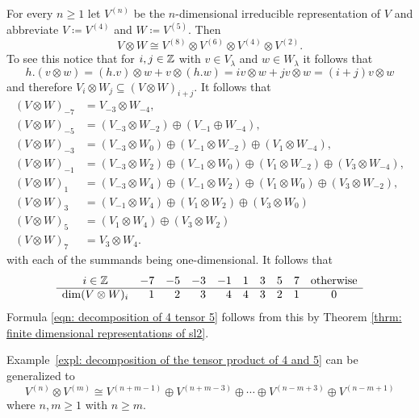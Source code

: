 \begin{expl}\label{expl: decomposition of the tensor product of 4 and 5}
 For every $n \geq 1$ let $V^{(n)}$ be the $n$-dimensional irreducible representation of $V$ and abbreviate $V \coloneqq V^{(4)}$ and $W \coloneqq V^{(5)}$. Then
 \begin{equation}\label{eqn: decomposition of 4 tensor 5}
  V \otimes W \cong V^{(8)} \otimes V^{(6)} \otimes V^{(4)} \otimes V^{(2)}.
 \end{equation}
 To see this notice that for $i,j \in \mathbb{Z}$ with $v \in V_\lambda$ and $w \in W_\lambda$ it follows that
 \[
  h.(v \otimes w)
  = (h.v) \otimes w + v \otimes (h.w)
  = iv \otimes w + jv \otimes w
  = (i+j) v \otimes w
 \]
 and therefore $V_i \otimes W_j \subseteq (V \otimes W)_{i+j}$. It follows that
 \begin{align*}
  (V \otimes W)_{-7}
  &= V_{-3} \otimes W_{-4}, \\
  (V \otimes W)_{-5}
  &= (V_{-3} \otimes W_{-2}) \oplus (V_{-1} \oplus W_{-4}), \\
  (V \otimes W)_{-3}
  &= (V_{-3} \otimes W_0) \oplus (V_{-1} \otimes W_{-2}) \oplus (V_1 \otimes W_{-4}), \\
  (V \otimes W)_{-1}
  &= (V_{-3} \otimes W_2) \oplus (V_{-1} \otimes W_0) \oplus (V_1 \otimes W_{-2}) \oplus (V_3 \otimes W_{-4}), \\
  (V \otimes W)_1
  &= (V_{-3} \otimes W_4) \oplus (V_{-1} \otimes W_2) \oplus (V_1 \otimes W_0) \oplus (V_3 \otimes W_{-2}), \\
  (V \otimes W)_3
  &= (V_{-1} \otimes W_4) \oplus (V_1 \otimes W_2) \oplus (V_3 \otimes W_0) \\
  (V \otimes W)_5
  &= (V_1 \otimes W_4) \oplus (V_3 \otimes W_2) \\
  (V \otimes W)_7
  &= V_3 \otimes W_4.
 \end{align*}
 with each of the summands being one-dimensional. It follows that
 \[
  \begin{array}{crrrrrrrrc}
   i \in \mathbb{Z}             & -7 & -5 & -3 & -1 & 1 & 3 & 5 & 7 & \text{otherwise} \\
   \hline
   \dim (V \otimes W)_i &  1 &  2 &  3 &  4 & 4 & 3 & 2 & 1 & 0
  \end{array}
 \]
 Formula \eqref{eqn: decomposition of 4 tensor 5} follows from this by Theorem \ref{thrm: finite dimensional representations of sl2}.
\end{expl}


\begin{rem}
 Example~\ref{expl: decomposition of the tensor product of 4 and 5} can be generalized to
 \[
  V^{(n)} \otimes V^{(m)}
  \cong V^{(n+m-1)} \oplus V^{(n+m-3)} \oplus \dotsb \oplus V^{(n-m+3)} \oplus V^{(n-m+1)}
 \]
 where $n, m \geq 1$ with $n \geq m$.
\end{rem}


















